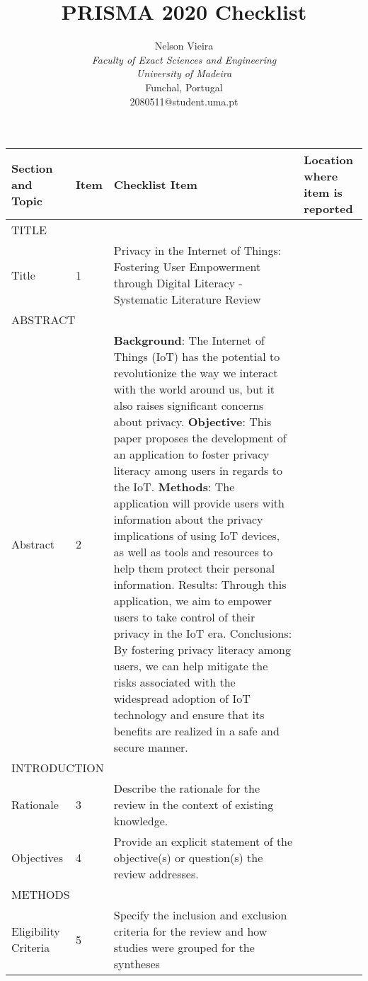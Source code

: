 \documentclass[landscape]{article}
\title{PRISMA 2020 Checklist}
\author{Nelson Vieira\\
\textit{Faculty of Exact Sciences and Engineering} \\
\textit{University of Madeira}\\
Funchal, Portugal \\
2080511@student.uma.pt
}
\begin{document}
\maketitle

\begin{longtable}{|p{2.5cm}|p{0.5cm}|p{18cm}|p{3cm}|}
    \hline
    \rowcolor{lightgray!5}
    \textbf{Section and Topic} & \textbf{Item} & \textbf{Checklist Item} & \textbf{Location where item is reported} \\
    \hline
    \multicolumn{4}{l}{TITLE} \\
    \hline
    Title & 1 & Privacy in the Internet of Things: Fostering User Empowerment through Digital Literacy - Systematic Literature Review & \\
    \hline \hline
    \multicolumn{4}{l}{ABSTRACT} \\
    \hline
    Abstract & 2 & \textbf{Background}: The Internet of Things (IoT) has the potential to revolutionize the way we interact with the world around us, but it also raises significant concerns about privacy. \newline\textbf{Objective}: This paper proposes the development of an application to foster privacy literacy among users in regards to the IoT. \newline\textbf{Methods}: The application will provide users with information about the privacy implications of using IoT devices, as well as tools and resources to help them protect their personal information. Results: Through this application, we aim to empower users to take control of their privacy in the IoT era. Conclusions: By fostering privacy literacy among users, we can help mitigate the risks associated with the widespread adoption of IoT technology and ensure that its benefits are realized in a safe and secure manner. & \\
    \hline \hline
    \multicolumn{4}{l}{INTRODUCTION} \\
    \hline
    Rationale & 3 & Describe the rationale for the review in the context of existing knowledge. & \\
    \hline
    Objectives & 4 & Provide an explicit statement of the objective(s) or question(s) the review addresses. & \\
    \hline \hline
    \multicolumn{4}{l}{METHODS} \\
    \hline
    Eligibility Criteria & 5 & Specify the inclusion and exclusion criteria for the review and how studies were grouped for the syntheses & \\
    \hline

\end{longtable}
\end{document}

